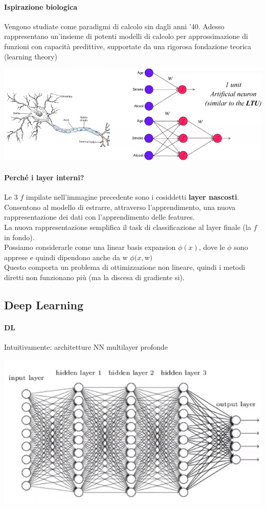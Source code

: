 \documentclass[10pt]{book}
\begin{document}
\paragraph{Ispirazione biologica} Vengono studiate come paradigmi di calcolo sin dagli anni '40. Adesso rappresentano un'insieme di potenti modelli di calcolo per approssimazione di funzioni con capacità predittive, supportate da una rigorosa fondazione teorica (learning theory)
\begin{center}
	\includegraphics[scale=0.65]{nn2.png}
\end{center}
\paragraph{Perché i layer interni?} Le 3 $f$ impilate nell'immagine precedente sono i cosiddetti \textbf{layer nascosti}.\\
Consentono al modello di estrarre, attraverso l'apprendimento, una nuova rappresentazione dei dati con l'apprendimento delle features.\\
La nuova rappresentazione semplifica il task di classificazione al layer finale (la $f$ in fondo).\\
Possiamo considerarle come una linear basis expansion $\phi(x)$, dove le $\phi$ sono apprese e quindi dipendono anche da w $\phi(x,$w$)$\\
Questo comporta un problema di ottimizzazione non lineare, quindi i metodi diretti non funzionano più (ma la discesa di gradiente si).
\pagebreak
\subsection{Deep Learning}
\paragraph{DL} Intuitivamente: architetture NN multilayer profonde
\begin{center}
	\includegraphics[scale=0.7]{dl.png}
\end{center}
\end{document}
